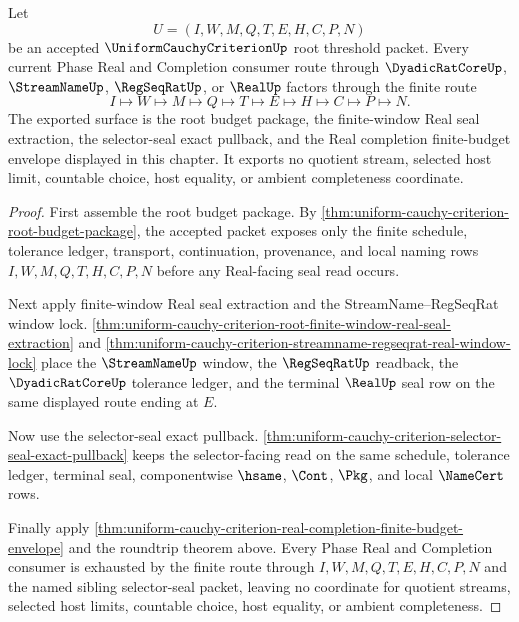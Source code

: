 \begin{theorem}
\label{thm:uniform-cauchy-criterion-phase-real-exit-consumer-exhaustion}
Let
$$
U=(I,W,M,Q,T,E,H,C,P,N)
$$
be an accepted $\UniformCauchyCriterionUp$ root threshold packet. Every current Phase Real and Completion consumer route through $\DyadicRatCoreUp$, $\StreamNameUp$, $\RegSeqRatUp$, or $\RealUp$ factors through the finite route
$$
I \longmapsto W \longmapsto M \longmapsto Q \longmapsto T \longmapsto E \longmapsto H \longmapsto C \longmapsto P \longmapsto N.
$$
The exported surface is the root budget package, the finite-window Real seal extraction, the selector-seal exact pullback, and the Real completion finite-budget envelope displayed in this chapter. It exports no quotient stream, selected host limit, countable choice, host equality, or ambient completeness coordinate.
\end{theorem}
\begin{proof}
First assemble the root budget package. By \autoref{thm:uniform-cauchy-criterion-root-budget-package}, the accepted packet exposes only the finite schedule, tolerance ledger, transport, continuation, provenance, and local naming rows $I,W,M,Q,T,H,C,P,N$ before any Real-facing seal read occurs.

Next apply finite-window Real seal extraction and the StreamName--RegSeqRat window lock. \autoref{thm:uniform-cauchy-criterion-root-finite-window-real-seal-extraction} and \autoref{thm:uniform-cauchy-criterion-streamname-regseqrat-real-window-lock} place the $\StreamNameUp$ window, the $\RegSeqRatUp$ readback, the $\DyadicRatCoreUp$ tolerance ledger, and the terminal $\RealUp$ seal row on the same displayed route ending at $E$.

Now use the selector-seal exact pullback. \autoref{thm:uniform-cauchy-criterion-selector-seal-exact-pullback} keeps the selector-facing read on the same schedule, tolerance ledger, terminal seal, componentwise $\hsame$, $\Cont$, $\Pkg$, and local $\NameCert$ rows.

Finally apply \autoref{thm:uniform-cauchy-criterion-real-completion-finite-budget-envelope} and the roundtrip theorem above. Every Phase Real and Completion consumer is exhausted by the finite route through $I,W,M,Q,T,E,H,C,P,N$ and the named sibling selector-seal packet, leaving no coordinate for quotient streams, selected host limits, countable choice, host equality, or ambient completeness.
\end{proof}

